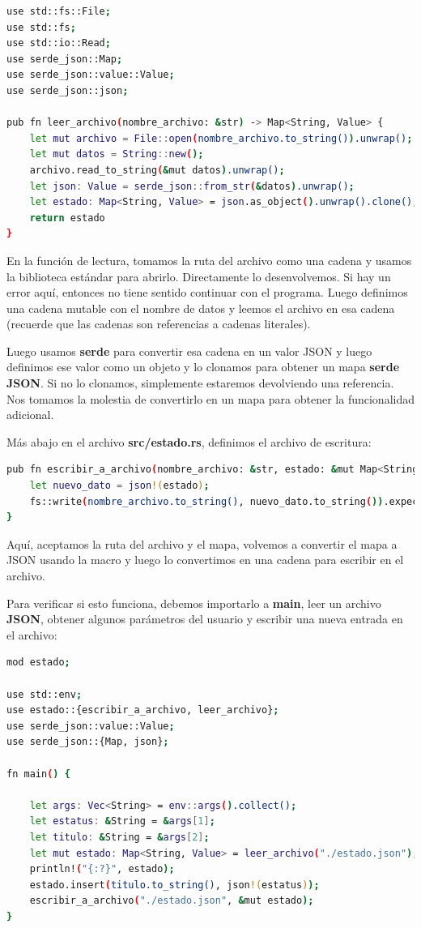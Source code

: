 \begin{lstlisting}[language=bash]
use std::fs::File;
use std::fs;
use std::io::Read;
use serde_json::Map;
use serde_json::value::Value;
use serde_json::json;

pub fn leer_archivo(nombre_archivo: &str) -> Map<String, Value> {
	let mut archivo = File::open(nombre_archivo.to_string()).unwrap();
	let mut datos = String::new();
	archivo.read_to_string(&mut datos).unwrap();
	let json: Value = serde_json::from_str(&datos).unwrap();
	let estado: Map<String, Value> = json.as_object().unwrap().clone();
	return estado
}
\end{lstlisting}

En la función de lectura, tomamos la ruta del archivo como una cadena y usamos la biblioteca estándar para abrirlo. Directamente lo desenvolvemos. Si hay un error aquí, entonces no tiene sentido continuar con el programa. Luego definimos una cadena mutable con el nombre de datos y leemos el archivo en esa cadena (recuerde que las cadenas son referencias a cadenas literales).

Luego usamos \textbf{serde} para convertir esa cadena en un valor JSON y luego definimos ese valor como un objeto y lo clonamos para obtener un mapa \textbf{serde JSON}. Si no lo clonamos, simplemente estaremos devolviendo una referencia. Nos tomamos la molestia de convertirlo en un mapa para obtener la funcionalidad adicional.

Más abajo en el archivo \textbf{src/estado.rs}, definimos el archivo de escritura:

\begin{lstlisting}[language=bash]
pub fn escribir_a_archivo(nombre_archivo: &str, estado: &mut Map<String, Value>) {
	let nuevo_dato = json!(estado);
	fs::write(nombre_archivo.to_string(), nuevo_dato.to_string()).expect("No se pudo escribir el archivo");   
}
\end{lstlisting}	

Aquí, aceptamos la ruta del archivo y el mapa, volvemos a convertir el mapa a JSON usando la macro y luego lo convertimos en una cadena para escribir en el archivo.

Para verificar si esto funciona, debemos importarlo a \textbf{main}, leer un archivo \textbf{JSON}, obtener algunos parámetros del usuario y escribir una nueva entrada en el archivo:

\begin{lstlisting}[language=bash]
mod estado;

use std::env;
use estado::{escribir_a_archivo, leer_archivo};
use serde_json::value::Value;
use serde_json::{Map, json};

fn main() {
	
	let args: Vec<String> = env::args().collect();
	let estatus: &String = &args[1];
	let titulo: &String = &args[2];
	let mut estado: Map<String, Value> = leer_archivo("./estado.json");
	println!("{:?}", estado);
	estado.insert(titulo.to_string(), json!(estatus));
	escribir_a_archivo("./estado.json", &mut estado);
}
\end{lstlisting}

